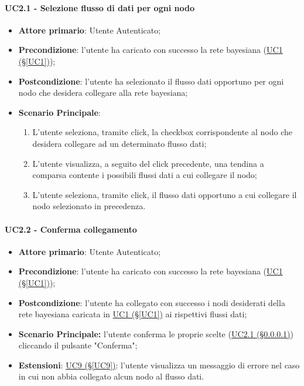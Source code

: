\paragraph{UC2.1 - Selezione flusso di dati per ogni nodo}\label{UC2.1}
\begin{itemize}
\item \textbf{Attore primario}: Utente Autenticato;
\item \textbf{Precondizione}: l'utente ha caricato con successo la rete bayesiana (\hyperref[UC1]{UC1 (§\ref*{UC1})});
\item \textbf{Postcondizione}: l'utente ha selezionato il flusso dati opportuno per ogni nodo che desidera collegare alla rete bayesiana;
\item \textbf{Scenario Principale}:
 \begin{enumerate}
 \item L'utente seleziona, tramite click, la checkbox corrispondente al nodo che desidera collegare ad un determinato flusso dati;
 \item L'utente visualizza, a seguito del click precedente, una tendina a comparsa contente i possibili flussi dati a cui collegare il nodo;
 \item L'utente seleziona, tramite click, il flusso dati opportuno a cui collegare il nodo selezionato in precedenza.
 \end{enumerate}
\end{itemize}

\paragraph{UC2.2 - Conferma collegamento}\label{UC2.2}
\begin{itemize}
\item \textbf{Attore primario}: Utente Autenticato;
\item \textbf{Precondizione}: l'utente ha caricato con successo la rete bayesiana (\hyperref[UC1]{UC1 (§\ref*{UC1})});
\item \textbf{Postcondizione}: l'utente ha collegato con successo i nodi desiderati della rete bayesiana caricata in \hyperref[UC1]{UC1 (§\ref*{UC1})} ai rispettivi flussi dati;
\item \textbf{Scenario Principale:} l'utente conferma le proprie scelte (\hyperref[UC2.1]{UC2.1 (§\ref*{UC2.1})}) cliccando il pulsante "Conferma";
\item \textbf{Estensioni}: \hyperref[UC9]{UC9 (§\ref*{UC9})}: l'utente visualizza un messaggio di errore nel caso in cui non abbia collegato alcun nodo al flusso dati.
\end{itemize}
\newpage

